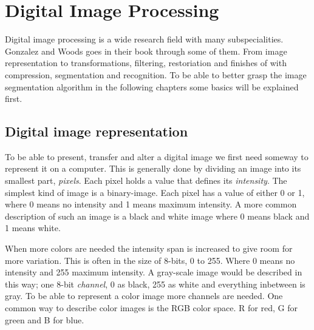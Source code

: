 \section{Digital Image Processing}
Digital image processing is a wide research field with many subspecialities.
Gonzalez and Woods \cite{gonzalez2008} goes in their book through some of them.
From image representation to transformations, filtering, restoriation and finishes
of with compression, segmentation and recognition. To be able to better grasp
the image segmentation algorithm in the following chapters some basics will be
explained first.

\subsection{Digital image representation}
To be able to present, transfer and alter a digital image we first need someway
to represent it on a computer. This is generally done by dividing an image into
its smallest part, {\em pixels}. Each pixel holds a value that defines its {\em intensity}.
The simplest kind of image is a binary-image. Each pixel has a value of either
0 or 1, where 0 means no intensity and 1 means maximum intensity. A more common
description of such an image is a black and white image where 0 means black and
1 means white.

When more colors are needed the intensity span is increased to give room for more
variation. This is often in the size of 8-bits, 0 to 255. Where 0 means no intensity
and 255 maximum intensity. A gray-scale image would be described in this way; one 8-bit
{\em channel}, 0 as black, 255 as white and everything inbetween is gray.
To be able to represent a color image more channels are needed. One common way
to describe color images is the RGB color space. R for red, G for green and B for
blue.

